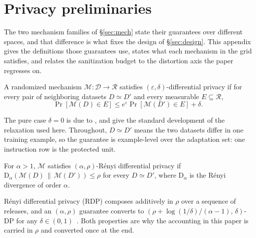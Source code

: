 \section{\label{apx:privacy}Privacy preliminaries}
The two mechanism families of \S\ref{sec:mech} state their guarantees over different spaces,
and that difference is what fixes the design of \S\ref{sec:design}.
This appendix gives the definitions those guarantees use,
states what each mechanism in the grid satisfies,
and relates the sanitization budget to the distortion axis the paper regresses on.

\begin{definition}
  \label{def:dp}
  A randomized mechanism $\mathcal{M} \colon \mathcal{D} \to \mathcal{R}$ satisfies $(\varepsilon, \delta)$-differential privacy if for every pair of neighboring datasets $D \simeq D'$ and every measurable $E \subseteq \mathcal{R}$,
  \begin{equation*}
    \Pr[\mathcal{M}(D) \in E] \le e^{\varepsilon} \Pr[\mathcal{M}(D') \in E] + \delta .
  \end{equation*}
\end{definition}
The pure case $\delta = 0$ is due to \citet{dwork2006calibrating},
and \citet{dwork2014algorithmic} give the standard development of the relaxation used here.
Throughout,
$D \simeq D'$ means the two datasets differ in one training example,
so the guarantee is example-level over the adaptation set:
one instruction row is the protected unit.

\begin{definition}
  \label{def:rdp}
  For $\alpha > 1$,
  $\mathcal{M}$ satisfies $(\alpha, \rho)$-R\'enyi differential privacy if $\mathrm{D}_{\alpha}\!\left(\mathcal{M}(D) \,\|\, \mathcal{M}(D')\right) \le \rho$ for every $D \simeq D'$,
  where $\mathrm{D}_{\alpha}$ is the R\'enyi divergence of order $\alpha$.
\end{definition}
R\'enyi differential privacy (RDP) composes additively in $\rho$ over a sequence of releases,
and an $(\alpha, \rho)$ guarantee converts to $\left(\rho + \log(1/\delta)/(\alpha - 1),\, \delta\right)$-DP for any $\delta \in (0, 1)$~\citep{mironov2017renyi}.
Both properties are why the accounting in this paper is carried in $\rho$ and converted once at the end.

